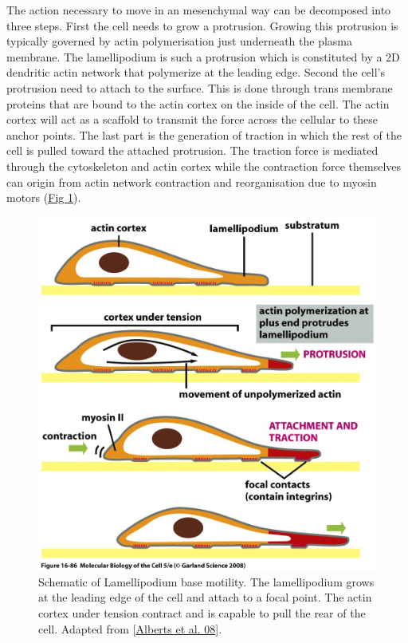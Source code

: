 \documentclass[A4paperpaper,11pt,english]{sphinxmanual}
\begin{document}
The action necessary to move in an mesenchymal way can be decomposed into three
steps. First the cell needs to grow a protrusion. Growing this protrusion is
typically governed by actin polymerisation just underneath the plasma membrane. The
lamellipodium is such a protrusion which is constituted by a 2D dendritic actin network
that polymerize at the leading edge. Second the cell's protrusion
need to attach to the surface. This is done through trans membrane proteins
that are bound to the actin cortex on the inside of the cell. The actin cortex
will act as a scaffold to transmit the force across the cellular to these
anchor points. The last part is the generation of traction in which the rest of the cell is pulled
toward the attached protrusion. The traction force is mediated through the
cytoskeleton and actin cortex while the contraction force themselves can origin
from actin network contraction and reorganisation due to myosin motors (\hyperref[parts/part1:fig-lam-principle]{Fig  \ref*{parts/part1:fig-lam-principle}}).
\begin{figure}[htbp]
\centering
\capstart

\includegraphics[width=0.900\linewidth]{figure-16-86.jpg}
\caption{Schematic of Lamellipodium base motility. The lamellipodium grows at the
leading edge of the cell and attach to a focal point. The actin cortex
under tension contract and is capable to pull the rear of the cell. Adapted
from {\hyperref[parts/part1:alberts2008]{{[}Alberts et al. 08{]}}}.}\label{parts/part1:fig-lam-principle}\end{figure}
\end{document}
